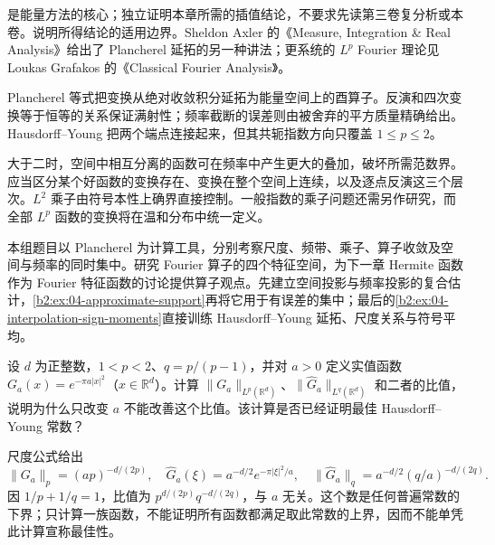 是能量方法的核心；独立证明本章所需的插值结论，不要求先读第三卷复分析或本卷。说明所得结论的适用边界。Sheldon Axler 的《Measure, Integration \& Real Analysis》\cite[Section 11C, pp. 375--377]{Axler2020Measure}给出了 Plancherel 延拓的另一种讲法；更系统的 \(L^p\) Fourier 理论见 Loukas Grafakos 的《Classical Fourier Analysis》\cite{Grafakos2014Classical}。





\begin{chaptersummary}
Plancherel 等式把变换从绝对收敛积分延拓为能量空间上的酉算子。反演和四次变换等于恒等的关系保证满射性；频率截断的误差则由被舍弃的平方质量精确给出。Hausdorff--Young 把两个端点连接起来，但其共轭指数方向只覆盖 \(1\leq p\leq2\)。

\ProseParagraphBreak

大于二时，空间中相互分离的函数可在频率中产生更大的叠加，破坏所需范数界。应当区分某个好函数的变换存在、变换在整个空间上连续，以及逐点反演这三个层次。\(L^2\) 乘子由符号本性上确界直接控制。一般指数的乘子问题还需另作研究，而全部 \(L^p\) 函数的变换将在温和分布中统一定义。
\end{chaptersummary}

\BookExercises

本组题目以 Plancherel 为计算工具，分别考察尺度、频带、乘子、算子收敛及空间与频率的同时集中。研究 Fourier 算子的四个特征空间，为下一章 Hermite 函数作为 Fourier 特征函数的讨论提供算子观点。先建立空间投影与频率投影的复合估计，\cref{b2:ex:04-approximate-support}再将它用于有误差的集中；最后的\cref{b2:ex:04-interpolation-sign-moments}直接训练 Hausdorff--Young 延拓、尺度关系与符号平均。

\begin{exercise}\label{b2:ex:04-gaussian-ratio}
设 \(d\) 为正整数，\(1<p<2\)、\(q=p/(p-1)\)，并对 \(a>0\) 定义实值函数 \(G_a(x)=e^{-\pi a|x|^2}\)（\(x\in\mathbb R^d\)）。计算 \(\|G_a\|_{L^p(\mathbb R^d)}\)、\(\|\widehat G_a\|_{L^q(\mathbb R^d)}\) 和二者的比值，说明为什么只改变 \(a\) 不能改善这个比值。该计算是否已经证明最佳 Hausdorff--Young 常数？
\end{exercise}
\begin{solution}
尺度公式给出
\[
 \|G_a\|_p=(ap)^{-d/(2p)},\quad
 \widehat G_a(\xi)=a^{-d/2}e^{-\pi|\xi|^2/a},\quad
 \|\widehat G_a\|_q=a^{-d/2}(q/a)^{-d/(2q)}.
\]
因 \(1/p+1/q=1\)，比值为 \(p^{d/(2p)}q^{-d/(2q)}\)，与 \(a\) 无关。这个数是任何普遍常数的下界；只计算一族函数，不能证明所有函数都满足取此常数的上界，因而不能单凭此计算宣称最佳性。
\end{solution}

